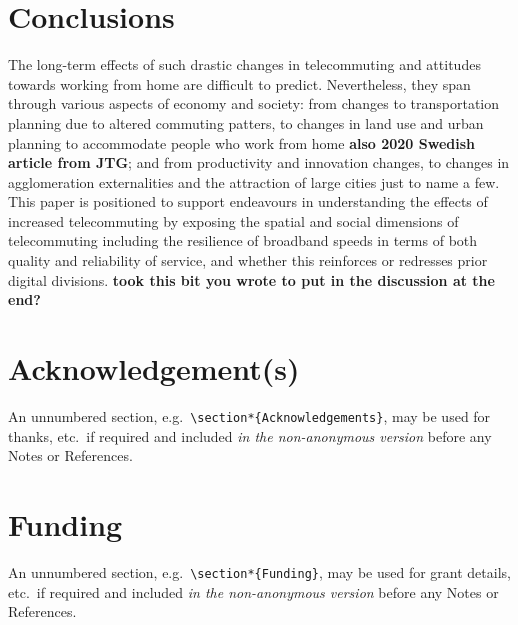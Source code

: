 \documentclass[]{interact}
\theoremstyle{plain}%
\theoremstyle{definition}
\theoremstyle{remark}
\begin{document}
\hypertarget{sec:5}{%
\section{Conclusions}\label{sec:5}}

The long-term effects of such drastic changes in telecommuting and
attitudes towards working from home are difficult to predict.
Nevertheless, they span through various aspects of economy and society:
from changes to transportation planning due to altered commuting
patters, to changes in land use and urban planning to accommodate people
who work from home \citep{BUDNITZ2020102713}\textbf{also 2020 Swedish
article from JTG}; and from productivity and innovation changes, to
changes in agglomeration externalities and the attraction of large
cities \citep{econobs} just to name a few. This paper is positioned to
support endeavours in understanding the effects of increased
telecommuting by exposing the spatial and social dimensions of
telecommuting including the resilience of broadband speeds in terms of
both quality and reliability of service, and whether this reinforces or
redresses prior digital divisions. \textbf{took this bit you wrote to
put in the discussion at the end?}

\hypertarget{acknowledgements}{%
\section*{Acknowledgement(s)}\label{acknowledgements}}

An unnumbered section,
e.g.~\texttt{\textbackslash{}section*\{Acknowledgements\}}, may be used
for thanks, etc.~if required and included \emph{in the non-anonymous
version} before any Notes or References.

\hypertarget{funding}{%
\section*{Funding}\label{funding}}

An unnumbered section,
e.g.~\texttt{\textbackslash{}section*\{Funding\}}, may be used for grant
details, etc.~if required and included \emph{in the non-anonymous
version} before any Notes or References.






\end{document}
